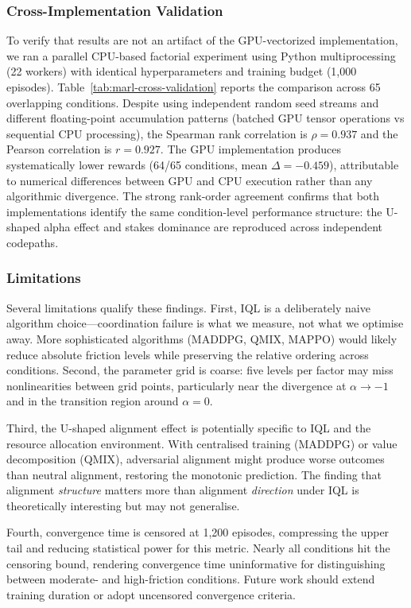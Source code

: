 \subsubsection{Cross-Implementation Validation}

To verify that results are not an artifact of the GPU-vectorized implementation, we ran a parallel CPU-based factorial experiment using Python multiprocessing (22 workers) with identical hyperparameters and training budget (1,000 episodes). Table~\ref{tab:marl-cross-validation} reports the comparison across 65 overlapping conditions. Despite using independent random seed streams and different floating-point accumulation patterns (batched GPU tensor operations vs sequential CPU processing), the Spearman rank correlation is $\rho = 0.937$ and the Pearson correlation is $r = 0.927$. The GPU implementation produces systematically lower rewards (64/65 conditions, mean $\Delta = -0.459$), attributable to numerical differences between GPU and CPU execution rather than any algorithmic divergence. The strong rank-order agreement confirms that both implementations identify the same condition-level performance structure: the U-shaped alpha effect and stakes dominance are reproduced across independent codepaths.

\subsubsection{Limitations}

Several limitations qualify these findings. First, IQL is a deliberately naive algorithm choice---coordination failure is what we measure, not what we optimise away. More sophisticated algorithms (MADDPG, QMIX, MAPPO) would likely reduce absolute friction levels while preserving the relative ordering across conditions. Second, the parameter grid is coarse: five levels per factor may miss nonlinearities between grid points, particularly near the divergence at $\alpha \to -1$ and in the transition region around $\alpha = 0$.

Third, the U-shaped alignment effect is potentially specific to IQL and the resource allocation environment. With centralised training (MADDPG) or value decomposition (QMIX), adversarial alignment might produce worse outcomes than neutral alignment, restoring the monotonic prediction. The finding that alignment \emph{structure} matters more than alignment \emph{direction} under IQL is theoretically interesting but may not generalise.

Fourth, convergence time is censored at 1,200 episodes, compressing the upper tail and reducing statistical power for this metric. Nearly all conditions hit the censoring bound, rendering convergence time uninformative for distinguishing between moderate- and high-friction conditions. Future work should extend training duration or adopt uncensored convergence criteria.

